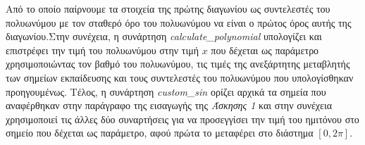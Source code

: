 \documentclass[Second Project.tex]{subfiles}
\begin{document}
Από το οποίο παίρνουμε τα στοιχεία της πρώτης διαγωνίου ως συντελεστές του πολυωνύμου με τον σταθερό όρο του πολυωνύμου να είναι ο πρώτος 
όρος αυτής της διαγωνίου.Στην συνέχεια, η συνάρτηση \textlatin{\textit{calculate\_polynomial}} υπολογίζει και επιστρέφει την τιμή του 
πολυωνύμου στην τιμή $x$ που δέχεται ως παράμετρο χρησιμοποιώντας τον βαθμό του πολυωνύμου, τις τιμές της ανεξάρτητης μεταβλητής των σημείων 
εκπαίδευσης και τους συντελεστές του πολυωνύμου που υπολογίσθηκαν προηγουμένως. Τέλος, η συνάρτηση \textlatin{\textit{custom\_sin}} ορίζει 
αρχικά τα σημεία που αναφέρθηκαν στην παράγραφο της εισαγωγής της \textit{Άσκησης 1} και στην συνέχεια χρησιμοποιεί τις άλλες δύο συναρτήσεις 
για να προσεγγίσει την τιμή του ημιτόνου στο σημείο που δέχεται ως παράμετρο, αφού πρώτα το μεταφέρει στο διάστημα $[0,2\pi]$. 
\newpage
\end{document}
